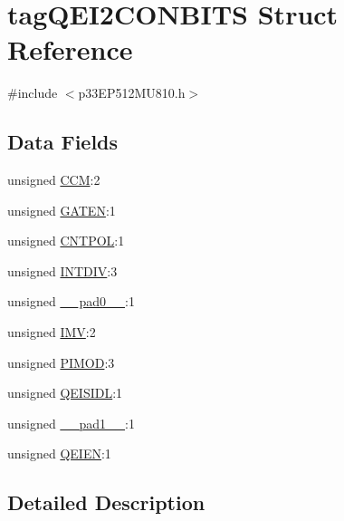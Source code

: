 \hypertarget{structtag_q_e_i2_c_o_n_b_i_t_s}{}\section{tag\+Q\+E\+I2\+C\+O\+N\+B\+I\+TS Struct Reference}
\label{structtag_q_e_i2_c_o_n_b_i_t_s}


{\ttfamily \#include $<$p33\+E\+P512\+M\+U810.\+h$>$}

\subsection*{Data Fields}
\begin{DoxyCompactItemize}
\item 
unsigned \hyperlink{structtag_q_e_i2_c_o_n_b_i_t_s_ab8c998ed01259b6b6e47cc3b54c675f3}{C\+CM}\+:2
\item 
unsigned \hyperlink{structtag_q_e_i2_c_o_n_b_i_t_s_af24e686dc228d3da43508aa11b6c5eb2}{G\+A\+T\+EN}\+:1
\item 
unsigned \hyperlink{structtag_q_e_i2_c_o_n_b_i_t_s_aebfda84f41fa40e6899eeeb3c795d50b}{C\+N\+T\+P\+OL}\+:1
\item 
unsigned \hyperlink{structtag_q_e_i2_c_o_n_b_i_t_s_ab4c7f4a9e9d2824b54be89a9798d6e39}{I\+N\+T\+D\+IV}\+:3
\item 
unsigned \hyperlink{structtag_q_e_i2_c_o_n_b_i_t_s_adf71f3d8410c1f1dbbc96680a92c49af}{\+\_\+\+\_\+pad0\+\_\+\+\_\+}\+:1
\item 
unsigned \hyperlink{structtag_q_e_i2_c_o_n_b_i_t_s_a38f7c055f4c40e952c25d8b0fdb691a8}{I\+MV}\+:2
\item 
unsigned \hyperlink{structtag_q_e_i2_c_o_n_b_i_t_s_adcfde04c51defc9d36ec58e4c15cc28e}{P\+I\+M\+OD}\+:3
\item 
unsigned \hyperlink{structtag_q_e_i2_c_o_n_b_i_t_s_adf814839ec245aa961a874d878c37329}{Q\+E\+I\+S\+I\+DL}\+:1
\item 
unsigned \hyperlink{structtag_q_e_i2_c_o_n_b_i_t_s_acaf2d0924a107ec6e8d2e31febaf66f9}{\+\_\+\+\_\+pad1\+\_\+\+\_\+}\+:1
\item 
unsigned \hyperlink{structtag_q_e_i2_c_o_n_b_i_t_s_ad84b7ff5d720a8a5a8c3c04b9ffc346b}{Q\+E\+I\+EN}\+:1
\end{DoxyCompactItemize}


\subsection{Detailed Description}


